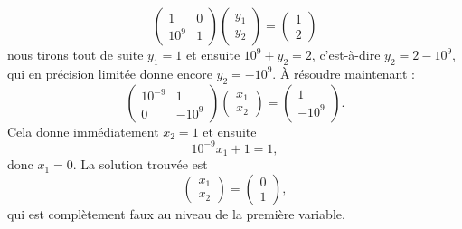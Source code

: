 \begin{example}
\begin{equation}
		\begin{pmatrix}
			1    & 0 \\
			10^9 & 1
		\end{pmatrix}\begin{pmatrix}
			y_1 \\
			y_2
		\end{pmatrix}=\begin{pmatrix}
			1 \\
			2
		\end{pmatrix}
	\end{equation}
	nous tirons tout de suite \( y_1=1\) et ensuite \( 10^9+y_2=2\), c'est-à-dire \( y_2=2-10^9\), qui en précision limitée donne encore \( y_2=-10^9\). À résoudre maintenant :
	\begin{equation}
		\begin{pmatrix}
			10^{-9} & 1     \\
			0       & -10^9
		\end{pmatrix}\begin{pmatrix}
			x_1 \\
			x_2
		\end{pmatrix}=\begin{pmatrix}
			1 \\
			-10^9
		\end{pmatrix}.
	\end{equation}
	Cela donne immédiatement \( x_2=1\) et ensuite
	\begin{equation}
		10^{-9}x_1+1=1,
	\end{equation}
	donc \( x_1=0\). La solution trouvée est
	\begin{equation}        \label{EQooBGWEooVGSVoe}
		\begin{pmatrix}
			x_1 \\
			x_2
		\end{pmatrix}=\begin{pmatrix}
			0 \\
			1
		\end{pmatrix},
	\end{equation}
	qui est complètement faux au niveau de la première variable.
\end{example}

